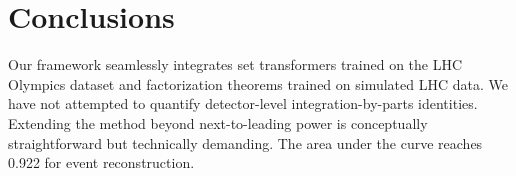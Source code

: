 \section{Conclusions}\label{sec:conclusions}

Our framework seamlessly integrates set transformers trained on the LHC
Olympics dataset and factorization theorems trained on simulated LHC
data. We have not attempted to quantify detector-level
integration-by-parts identities. Extending the method beyond
next-to-leading power is conceptually straightforward but technically
demanding. The area under the curve reaches 0.922 for event
reconstruction.

